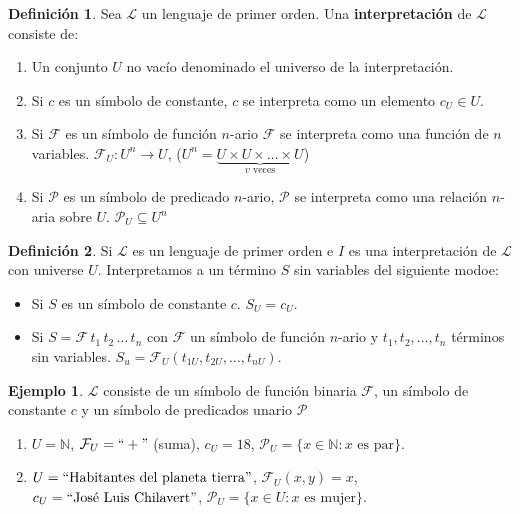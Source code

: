 \documentclass[a4paper,11pt]{article}
\theoremstyle{definition}
\newtheorem{defn}{Definición}[section]
\newtheorem{exap}{Ejemplo}[section]
\theoremstyle{remark}
\def\FF{\ensuremath{\mathcal{F}}}
\def\NN{\mathbb{N}}
\def\LL{\ensuremath{\mathcal{L}}}
\def\PP{\ensuremath{\mathcal{P}}}
\begin{document}
\begin{defn}
    Sea $\LL$ un lenguaje de primer orden. Una \textbf{interpretación} de $\LL$ consiste de:
    
    \begin{enumerate}
        \item Un conjunto $U$ no vacío denominado el universo de la interpretación.
        
        \item Si $c$ es un símbolo de constante, $c$ se interpreta como un elemento $c_U \in U$.
        
        \item Si $\FF$ es un símbolo de función $n$-ario $\FF$ se interpreta
        como una función de $n$ variables. $\FF_U : U^n \to U$, 
        ($U^n = \underbrace{U \times U \times \dots \times U}_{v \text{ veces}}$)
        
        \item Si $\PP$ es un símbolo de predicado $n$-ario, $\PP$ se interpreta como
        una relación $n$-aria sobre $U$. $\PP_U \subseteq U^n$
    \end{enumerate}
\end{defn}

\begin{defn}
    Si $\LL$ es un lenguaje de primer orden e $I$ es una interpretación de $\LL$ con
    universe $U$. Interpretamos a un término $S$ sin variables del siguiente modoe:
    
    \begin{itemize}
        \item Si $S$ es un símbolo de constante $c$. $S_U = c_U$.
        
        \item Si $S = \FF\,t_1\,t_2\,\dots\,t_n$ con $\FF$ un símbolo de función
        $n$-ario y $t_1, t_2, \dots, t_n$ términos sin variables.        
        $S_u = \FF_U(t_{1U}, t_{2U}, \dots, t_{nU})$.
    \end{itemize}
\end{defn}

\begin{exap}
    $\LL$ consiste de un símbolo  de función binaria $\FF$, un símbolo de constante $c$
    y un símbolo de predicados unario $\PP$
    
    \begin{enumerate}
        \item $U = \NN$, $\FF_U = ``+"$ (suma), $c_U = 18$, $\PP_U = \{x \in \NN : x \text{ es par}\}$.
        
        \item $U = ``\text{Habitantes del planeta tierra}"$, $\FF_U(x,y) = x$, 
        $c_U = ``\text{José Luis Chilavert}"$, $\PP_U = \{x \in U : x \text{ es mujer}\}$.
    \end{enumerate}
\end{exap}
\end{document}
